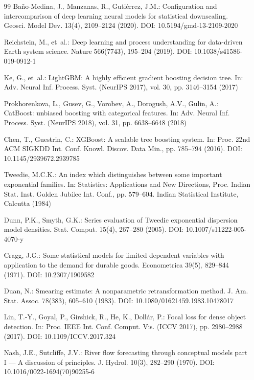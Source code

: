 \documentclass[pdflatex,sn-mathphys,Numbered]{sn-jnl}
\begin{document}
\begin{thebibliography}{99}
Ba{\~n}o-Medina, J., Manzanas, R., Guti{\'e}rrez, J.M.: Configuration and intercomparison of deep learning neural models for statistical downscaling. Geosci. Model Dev. 13(4), 2109--2124 (2020). DOI: 10.5194/gmd-13-2109-2020

Reichstein, M., et~al.: Deep learning and process understanding for data-driven Earth system science. Nature 566(7743), 195--204 (2019). DOI: 10.1038/s41586-019-0912-1

Ke, G., et~al.: LightGBM: A highly efficient gradient boosting decision tree. In: Adv. Neural Inf. Process. Syst. (NeurIPS 2017), vol. 30, pp. 3146--3154 (2017)

Prokhorenkova, L., Gusev, G., Vorobev, A., Dorogush, A.V., Gulin, A.: CatBoost: unbiased boosting with categorical features. In: Adv. Neural Inf. Process. Syst. (NeurIPS 2018), vol. 31, pp. 6638--6648 (2018)

Chen, T., Guestrin, C.: XGBoost: A scalable tree boosting system. In: Proc. 22nd ACM SIGKDD Int. Conf. Knowl. Discov. Data Min., pp. 785--794 (2016). DOI: 10.1145/2939672.2939785

Tweedie, M.C.K.: An index which distinguishes between some important exponential families. In: Statistics: Applications and New Directions, Proc. Indian Stat. Inst. Golden Jubilee Int. Conf., pp. 579--604. Indian Statistical Institute, Calcutta (1984)

Dunn, P.K., Smyth, G.K.: Series evaluation of Tweedie exponential dispersion model densities. Stat. Comput. 15(4), 267--280 (2005). DOI: 10.1007/s11222-005-4070-y

Cragg, J.G.: Some statistical models for limited dependent variables with application to the demand for durable goods. Econometrica 39(5), 829--844 (1971). DOI: 10.2307/1909582

Duan, N.: Smearing estimate: A nonparametric retransformation method. J. Am. Stat. Assoc. 78(383), 605--610 (1983). DOI: 10.1080/01621459.1983.10478017

Lin, T.-Y., Goyal, P., Girshick, R., He, K., Doll{\'a}r, P.: Focal loss for dense object detection. In: Proc. IEEE Int. Conf. Comput. Vis. (ICCV 2017), pp. 2980--2988 (2017). DOI: 10.1109/ICCV.2017.324

Nash, J.E., Sutcliffe, J.V.: River flow forecasting through conceptual models part I --- A discussion of principles. J. Hydrol. 10(3), 282--290 (1970). DOI: 10.1016/0022-1694(70)90255-6


\end{thebibliography}
\end{document}

